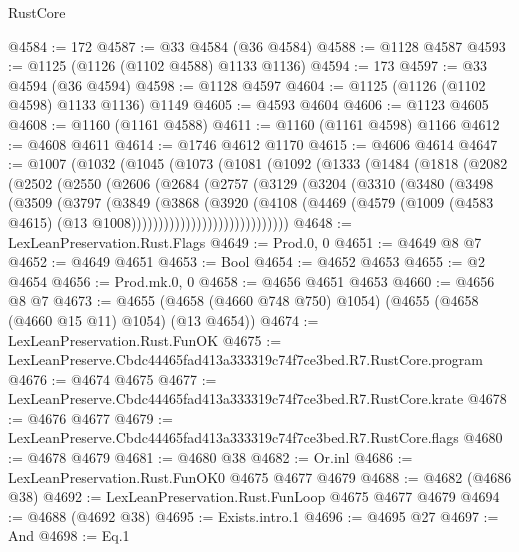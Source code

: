 \begin{lexlean}{RustCore}
\begin{coremodule}
@4584 := 172
@4587 := @33 @4584 (@36 @4584)
@4588 := @1128 @4587
@4593 := @1125 (@1126 (@1102 @4588) @1133 @1136)
@4594 := 173
@4597 := @33 @4594 (@36 @4594)
@4598 := @1128 @4597
@4604 := @1125 (@1126 (@1102 @4598) @1133 @1136) @1149
@4605 := @4593 @4604
@4606 := @1123 @4605
@4608 := @1160 (@1161 @4588)
@4611 := @1160 (@1161 @4598) @1166
@4612 := @4608 @4611
@4614 := @1746 @4612 @1170
@4615 := @4606 @4614
@4647 := @1007
    (@1032
      (@1045
        (@1073
          (@1081
            (@1092
              (@1333
                (@1484
                  (@1818
                    (@2082
                      (@2502
                        (@2550
                          (@2606
                            (@2684
                              (@2757
                                (@3129
                                  (@3204
                                    (@3310
                                      (@3480
                                        (@3498
                                          (@3509
                                            (@3797
                                              (@3849
                                                (@3868
                                                  (@3920
                                                    (@4108
                                                      (@4469
                                                        (@4579
                                                          (@1009
                                                            (@4583 @4615)
                                                            (@13 @1008)))))))))))))))))))))))))))))
@4648 := LexLeanPreservation.Rust.Flags
@4649 := Prod.{0, 0}
@4651 := @4649 @8 @7
@4652 := @4649 @4651
@4653 := Bool
@4654 := @4652 @4653
@4655 := @2 @4654
@4656 := Prod.mk.{0, 0}
@4658 := @4656 @4651 @4653
@4660 := @4656 @8 @7
@4673 := @4655 (@4658 (@4660 @748 @750) @1054) (@4655 (@4658 (@4660 @15 @11) @1054) (@13 @4654))
@4674 := LexLeanPreservation.Rust.FunOK
@4675 := LexLeanPreserve.Cbdc44465fad413a333319c74f7ce3bed.R7.RustCore.program
@4676 := @4674 @4675
@4677 := LexLeanPreserve.Cbdc44465fad413a333319c74f7ce3bed.R7.RustCore.krate
@4678 := @4676 @4677
@4679 := LexLeanPreserve.Cbdc44465fad413a333319c74f7ce3bed.R7.RustCore.flags
@4680 := @4678 @4679
@4681 := @4680 @38
@4682 := Or.inl
@4686 := LexLeanPreservation.Rust.FunOK0 @4675 @4677 @4679
@4688 := @4682 (@4686 @38)
@4692 := LexLeanPreservation.Rust.FunLoop @4675 @4677 @4679
@4694 := @4688 (@4692 @38)
@4695 := Exists.intro.{1}
@4696 := @4695 @27
@4697 := And
@4698 := Eq.{1}

\end{coremodule}
\end{lexlean}
